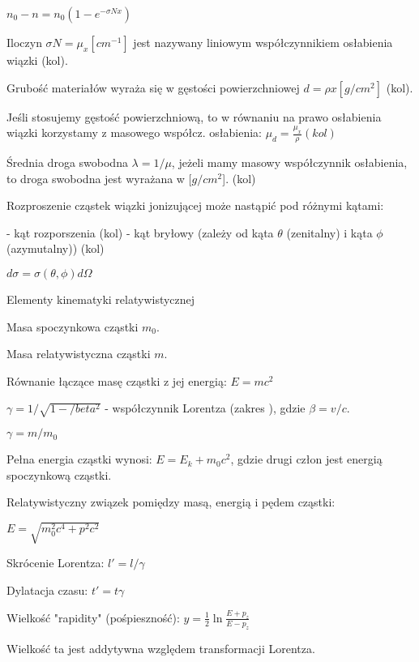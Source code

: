 \documentclass{article}
\begin{document}
$n_0 - n = n_0(1-e^{-\sigma N x})$

Iloczyn $\sigma N = \mu_x [cm^{-1}]$ jest nazywany liniowym współczynnikiem osłabienia wiązki (kol).

Grubość materiałów wyraża się w gęstości powierzchniowej $d = \rho x [g/cm^2]$ (kol).

Jeśli stosujemy gęstość powierzchniową, to w równaniu na prawo osłabienia wiązki korzystamy z masowego współcz. osłabienia: $\mu_d=\frac{\mu_x}{\rho} (kol)$

Średnia droga swobodna $\lambda = 1/\mu$, jeżeli mamy masowy współczynnik osłabienia, to droga swobodna jest wyrażana w [$g/cm^2$]. (kol)

Rozproszenie cząstek wiązki jonizującej może nastąpić pod różnymi kątami:

- kąt rozporszenia (kol)
- kąt bryłowy (zależy od kąta $\theta$ (zenitalny) i kąta $\phi$ (azymutalny)) (kol)

$d\sigma = \sigma(\theta,\phi)d\Omega$

Elementy kinematyki relatywistycznej

Masa spoczynkowa cząstki $m_0$.

Masa relatywistyczna cząstki $m$.

Równanie łączące masę cząstki z jej energią:
$E = mc^2$

$\gamma = 1/\sqrt{1-/beta^2}$ - współczynnik Lorentza (zakres ), gdzie $\beta = v/c$.

$\gamma = m/m_0$

Pełna energia cząstki wynosi:
$E = E_k + m_0c^2$, gdzie drugi człon jest energią spoczynkową cząstki.

Relatywistyczny związek pomiędzy masą, energią i pędem cząstki:

$E = \sqrt{m_0^2c^4 + p^2c^2}$

Skrócenie Lorentza: $l' = l/\gamma$

Dylatacja czasu: $t' = t\gamma$

Wielkość "rapidity" (pośpieszność):
$y = \frac{1}{2}\ln{\frac{E+p_z}{E-p_z}}$

Wielkość ta jest addytywna względem transformacji Lorentza.
\end{document}
